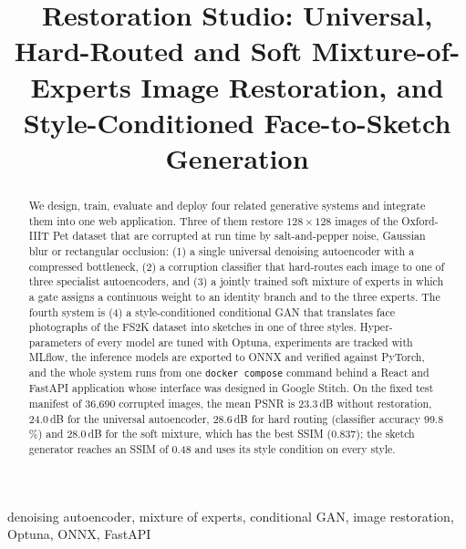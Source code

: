 \documentclass[conference]{IEEEtran}
\begin{document}
\title{Restoration Studio: Universal, Hard-Routed and Soft Mixture-of-Experts Image Restoration, and Style-Conditioned Face-to-Sketch Generation}

\author{
}

\maketitle

\begin{abstract}
We design, train, evaluate and deploy four related generative systems and integrate them into one web application. Three of them restore
$128\times128$ images of the Oxford-IIIT Pet dataset that are corrupted at run time by salt-and-pepper noise, Gaussian blur or rectangular
occlusion: (1) a single universal denoising autoencoder with a compressed bottleneck, (2) a corruption classifier that hard-routes each image to one of three
specialist autoencoders, and (3) a jointly trained soft mixture of experts in which a gate assigns a continuous weight to an identity branch and
to the three experts. The fourth system is (4) a style-conditioned conditional GAN that translates face photographs of the FS2K dataset into
sketches in one of three styles. Hyper-parameters of every model are tuned with Optuna, experiments are tracked with MLflow, the
inference models are exported to ONNX and verified against PyTorch, and the whole system runs from one \texttt{docker compose} command
behind a React and FastAPI application whose interface was designed in Google Stitch. On the fixed test manifest of 36,690 corrupted images, the mean PSNR is 23.3\,dB without restoration, 24.0\,dB for the universal autoencoder, 28.6\,dB for hard routing (classifier accuracy 99.8\,\%) and 28.0\,dB for the soft mixture, which has the best SSIM (0.837); the sketch generator reaches an SSIM of 0.48 and uses its style condition on every style.
\end{abstract}

\begin{IEEEkeywords}
denoising autoencoder, mixture of experts, conditional GAN, image restoration, Optuna, ONNX, FastAPI
\end{IEEEkeywords}
\end{document}
